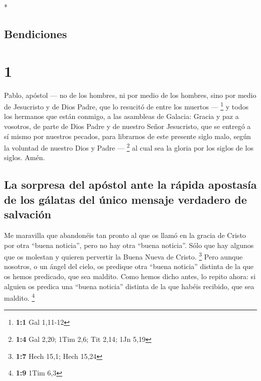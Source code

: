 \begin{paracol}{2} \switchcolumn[0]*

\hypertarget{bendiciones}{%
\subsection{Bendiciones}\label{bendiciones}}

\hypertarget{section}{%
\section{1}\label{section}}

 Pablo, apóstol --- no de los hombres, ni por medio de los
hombres, sino por medio de Jesucristo y de Dios Padre, que lo resucitó
de entre los muertos --- \footnote{\textbf{1:1} Gal 1,11-12}
 y todos los hermanos que están conmigo, a las asambleas
de Galacia:  Gracia y paz a vosotros, de parte de Dios
Padre y de nuestro Señor Jesucristo,  que se entregó a sí
mismo por nuestros pecados, para librarnos de este presente siglo malo,
según la voluntad de nuestro Dios y Padre --- \footnote{\textbf{1:4} Gal
  2,20; 1Tim 2,6; Tit 2,14; 1Jn 5,19}  al cual sea la
gloria por los siglos de los siglos. Amén.

\hypertarget{la-sorpresa-del-apuxf3stol-ante-la-ruxe1pida-apostasuxeda-de-los-guxe1latas-del-uxfanico-mensaje-verdadero-de-salvaciuxf3n}{%
\subsection{La sorpresa del apóstol ante la rápida apostasía de los
gálatas del único mensaje verdadero de
salvación}\label{la-sorpresa-del-apuxf3stol-ante-la-ruxe1pida-apostasuxeda-de-los-guxe1latas-del-uxfanico-mensaje-verdadero-de-salvaciuxf3n}}

 Me maravilla que abandonéis tan pronto al que os llamó en
la gracia de Cristo por otra ``buena noticia'',  pero no
hay otra ``buena noticia''. Sólo que hay algunos que os molestan y
quieren pervertir la Buena Nueva de Cristo. \footnote{\textbf{1:7} Hech
  15,1; Hech 15,24}  Pero aunque nosotros, o un ángel del
cielo, os predique otra ``buena noticia'' distinta de la que os hemos
predicado, que sea maldito.  Como hemos dicho antes, lo
repito ahora: si alguien os predica una ``buena noticia'' distinta de la
que habéis recibido, que sea maldito. \footnote{\textbf{1:9} 1Tim 6,3}


\end{paracol}
